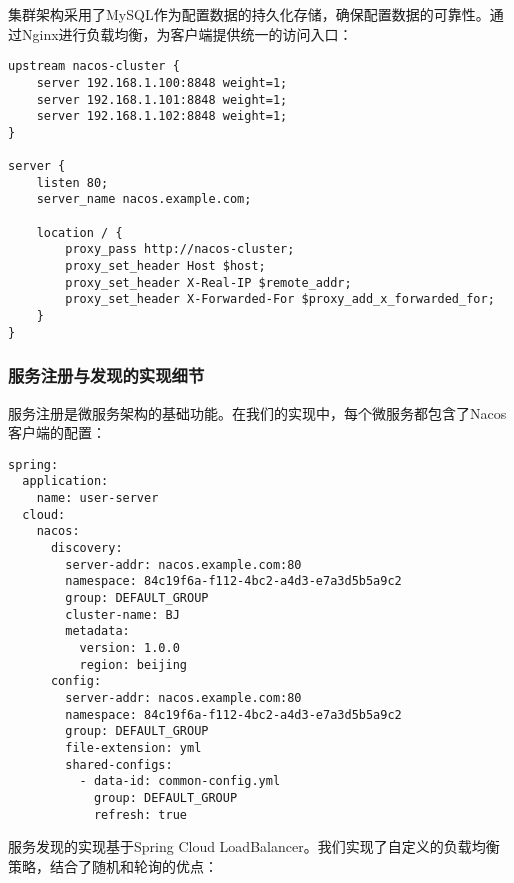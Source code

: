 \documentclass[a4paper,12pt]{article}
\begin{document}
集群架构采用了MySQL作为配置数据的持久化存储，确保配置数据的可靠性。通过Nginx进行负载均衡，为客户端提供统一的访问入口：

\begin{lstlisting}[caption=Nginx负载均衡配置]
upstream nacos-cluster {
    server 192.168.1.100:8848 weight=1;
    server 192.168.1.101:8848 weight=1;
    server 192.168.1.102:8848 weight=1;
}

server {
    listen 80;
    server_name nacos.example.com;
    
    location / {
        proxy_pass http://nacos-cluster;
        proxy_set_header Host $host;
        proxy_set_header X-Real-IP $remote_addr;
        proxy_set_header X-Forwarded-For $proxy_add_x_forwarded_for;
    }
}
\end{lstlisting}

\subsubsection{服务注册与发现的实现细节}

服务注册是微服务架构的基础功能。在我们的实现中，每个微服务都包含了Nacos客户端的配置：

\begin{lstlisting}[caption=微服务bootstrap.yml配置]
spring:
  application:
    name: user-server
  cloud:
    nacos:
      discovery:
        server-addr: nacos.example.com:80
        namespace: 84c19f6a-f112-4bc2-a4d3-e7a3d5b5a9c2
        group: DEFAULT_GROUP
        cluster-name: BJ
        metadata:
          version: 1.0.0
          region: beijing
      config:
        server-addr: nacos.example.com:80
        namespace: 84c19f6a-f112-4bc2-a4d3-e7a3d5b5a9c2
        group: DEFAULT_GROUP
        file-extension: yml
        shared-configs:
          - data-id: common-config.yml
            group: DEFAULT_GROUP
            refresh: true
\end{lstlisting}

服务发现的实现基于Spring Cloud LoadBalancer。我们实现了自定义的负载均衡策略，结合了随机和轮询的优点：
\end{document}
